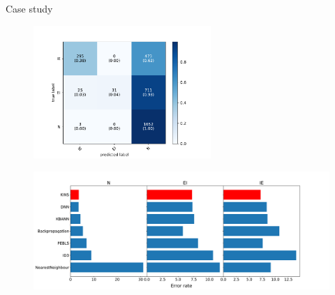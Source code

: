 \documentclass[presentation]{beamer}\mode<presentation>{\usetheme{AMSBolognaFC}}
\begin{document}
\begin{frame}{Case study}
    \framebreak
    
    \begin{figure}
        \centering
        \includegraphics[width=0.6\textwidth]{figures/dna-rules-confusion-matrix}
    \end{figure}
    
    \framebreak
    
    \begin{figure}
        \centering
        \includegraphics[width=\textwidth]{figures/kins-error-rate}
    \end{figure}
    
\end{frame}
\end{document}
